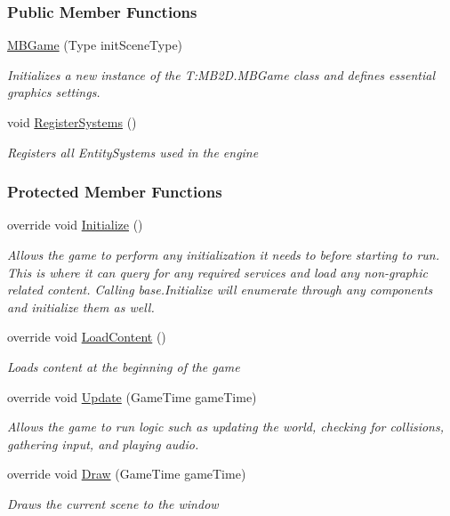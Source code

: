 \subsubsection*{Public Member Functions}
\begin{DoxyCompactItemize}
\item 
\hyperlink{class_m_b2_d_1_1_m_b_game_aa75fd490a977436f16a048d38face6f9}{M\+B\+Game} (Type init\+Scene\+Type)
\begin{DoxyCompactList}\small\item\em Initializes a new instance of the T\+:\+M\+B2\+D.\+M\+B\+Game class and defines essential graphics settings. \end{DoxyCompactList}\item 
void \hyperlink{class_m_b2_d_1_1_m_b_game_ad7e9a60dbaefe1416db0456b07b13487}{Register\+Systems} ()
\begin{DoxyCompactList}\small\item\em Registers all Entity\+Systems used in the engine \end{DoxyCompactList}\end{DoxyCompactItemize}
\subsubsection*{Protected Member Functions}
\begin{DoxyCompactItemize}
\item 
override void \hyperlink{class_m_b2_d_1_1_m_b_game_a2157be479c1831c49301cd472cc01cde}{Initialize} ()
\begin{DoxyCompactList}\small\item\em Allows the game to perform any initialization it needs to before starting to run. This is where it can query for any required services and load any non-\/graphic related content. Calling base.\+Initialize will enumerate through any components and initialize them as well. \end{DoxyCompactList}\item 
override void \hyperlink{class_m_b2_d_1_1_m_b_game_a64ee7de17491790b25b326a644789082}{Load\+Content} ()
\begin{DoxyCompactList}\small\item\em Loads content at the beginning of the game \end{DoxyCompactList}\item 
override void \hyperlink{class_m_b2_d_1_1_m_b_game_a82968a66f75f9c437074ce7bfd468455}{Update} (Game\+Time game\+Time)
\begin{DoxyCompactList}\small\item\em Allows the game to run logic such as updating the world, checking for collisions, gathering input, and playing audio. \end{DoxyCompactList}\item 
override void \hyperlink{class_m_b2_d_1_1_m_b_game_ad791072c4d2a5b23bbaec3542d6facc9}{Draw} (Game\+Time game\+Time)
\begin{DoxyCompactList}\small\item\em Draws the current scene to the window \end{DoxyCompactList}\end{DoxyCompactItemize}
